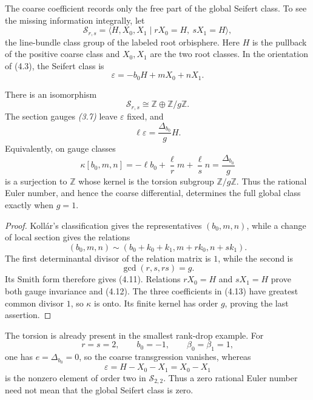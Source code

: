 \documentclass[11pt]{article}
\numberwithin{equation}{section}
\begin{document}
The coarse coefficient records only the free part of the global Seifert
class.  To see the missing information integrally, let
\[
 \mathcal S_{r,s}
 =\langle H,X_0,X_1\mid rX_0=H,\ sX_1=H\rangle,                  \tag{4.9}
\]
the line-bundle class group of the labeled root orbisphere.  Here $H$ is
the pullback of the positive coarse class and $X_0,X_1$ are the two root
classes.  In the orientation of (4.3), the Seifert class is
\[
                  \varepsilon=-b_0H+mX_0+nX_1.                  \tag{4.10}
\]

\begin{proposition}
There is an isomorphism
\[
                  \mathcal S_{r,s}\cong
                  \mathbb Z\oplus\mathbb Z/g\mathbb Z.          \tag{4.11}
\]
The section gauges \emph{(3.7)} leave $\varepsilon$ fixed, and
\[
                 \ell\varepsilon=\frac{\Delta_{b_0}}gH.         \tag{4.12}
\]
Equivalently, on gauge classes
\[
 \kappa[b_0,m,n]
   =-\ell b_0+\frac{\ell}{r}m+\frac{\ell}{s}n
   =\frac{\Delta_{b_0}}g                                      \tag{4.13}
\]
is a surjection to $\mathbb Z$ whose kernel is the torsion subgroup
$\mathbb Z/g\mathbb Z$.  Thus the rational Euler number, and hence the
coarse differential, determines the full global class exactly when $g=1$.
\end{proposition}

\begin{proof}
Koll\'ar's classification gives the representatives $(b_0,m,n)$, while a
change of local section gives the relations
\[
 (b_0,m,n)\sim(b_0+k_0+k_1,m+rk_0,n+sk_1).
\]
The first determinantal divisor of the relation matrix is $1$, while the
second is
\[
                         \gcd(r,s,rs)=g.
\]
Its Smith form therefore gives (4.11).  Relations $rX_0=H$ and $sX_1=H$
prove both gauge invariance and (4.12).  The three coefficients in (4.13)
have greatest common divisor $1$, so $\kappa$ is onto.  Its finite kernel has
order $g$, proving the last assertion.
\end{proof}

The torsion is already present in the smallest rank-drop example.  For
\[
 r=s=2,\qquad b_0=-1,\qquad \beta_0=\beta_1=1,                 \tag{4.14}
\]
one has $e=\Delta_{b_0}=0$, so the coarse transgression vanishes, whereas
\[
 \varepsilon=H-X_0-X_1=X_0-X_1
\]
is the nonzero element of order two in $\mathcal S_{2,2}$.  Thus a zero
rational Euler number need not mean that the global Seifert class is zero.
\end{document}
